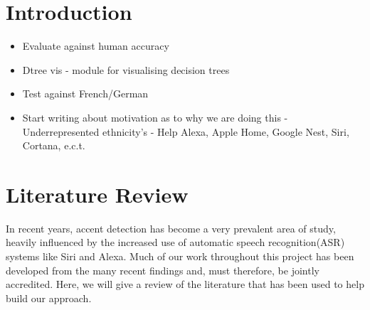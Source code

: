 \documentclass[11pt,a4paper,twoside]{article}
\title{\theTitle}
\author{\theAuthors}
\date{\today}
\begin{document}
\maketitle

\thispagestyle{empty}	


\begin{abstract}


 
\end{abstract}


\newpage
\setcounter{page}{1}


\section{Introduction}

\begin{itemize}
    \item Evaluate against human accuracy
    \item Dtree vis - module for visualising decision trees
    \item Test against French/German
    \item Start writing about motivation as to why we are doing this - Underrepresented ethnicity's - Help Alexa, Apple Home, Google Nest, Siri, Cortana, e.c.t. 
\end{itemize}


\section{Literature Review}
In recent years, accent detection has become a very prevalent area of study, heavily influenced by the increased use of automatic speech recognition(ASR) systems like Siri and Alexa. Much of our work throughout this project has been developed from the many recent findings and, must therefore, be jointly accredited. Here, we will give a review of the literature that has been used to help build our approach.
\end{document}
